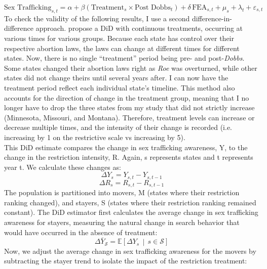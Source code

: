 \documentclass[10pt]{article}
\begin{document}
\begin{equation}
\text{Sex Trafficking}_{s,t}
=
\alpha
+ \beta \left( \text{Treatment}_{s}
\times \text{Post Dobbs}_{t} \right)
+ \delta\,\text{FEA}_{s,t}
+ \mu_{s}
+ \lambda_{t}
+ \varepsilon_{s,t}
\end{equation}
To check the validity of the following results, I use a second difference-in-difference approach. \cite{diff2} propose a DiD with continuous treatments, occurring at various times for various groups. Because each state has control over their respective abortion laws, the laws can change at different times for different states. Now, there is no single ``treatment'' period being pre- and post-\textit{Dobbs}. Some states changed their abortion laws right as \textit{Roe} was overturned, while other states did not change theirs until several years after. I can now have the treatment period reflect each individual state's timeline. This method also accounts for the direction of change in the treatment group, meaning that I no longer have to drop the three states from my study that did not strictly increase (Minnesota, Missouri, and Montana). Therefore, treatment levels can increase or decrease multiple times, and the intensity of their change is recorded (i.e. increasing by 1 on the restrictive scale vs increasing by 5). \\
\indent This DiD estimate compares the change in sex trafficking awareness, Y, to the change in the restriction intensity, R. Again, s represents states and t represents year t. We calculate these changes as: 
\begin{equation}
\Delta Y_s = Y_{s,t} - Y_{s,t-1}
\end{equation}
\begin{equation}
\Delta R_s = R_{s,t} - R_{s,t-1}
\end{equation}
The population is partitioned into movers, M (states where their restriction ranking changed), and stayers, S (states where their restriction ranking remained constant). The DiD estimator first calculates the average change in sex trafficking awareness for stayers, measuring the natural change in search behavior that would have occurred in the absence of treatment: 
\begin{equation}
\Delta \bar{Y}_{\mathcal{S}} = \mathbb{E}\left[ \Delta Y_s \,\middle|\, s \in \mathcal{S} \right]
\end{equation}
Now, we adjust the average change in sex trafficking awareness for the movers by subtracting the stayer trend to isolate the impact of the restriction treatment:
\end{document}
